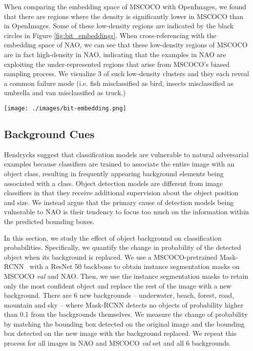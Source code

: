 \documentclass[final]{cvpr}
\begin{document}
When comparing the embedding space of MSCOCO with OpenImages, we found that there are regions where the density is significantly lower in MSCOCO than in OpenImages. Some of these low-density regions are indicated by the black circles in Figure \ref{fig:bit_embeddings}. When cross-referencing with the embedding space of NAO, we can see that these low-density regions of MSCOCO are in fact high-density in NAO, indicating that the examples in NAO are exploiting the under-represented regions that arise from MSCOCO's biased sampling process. We visualize 3 of such low-density clusters and they each reveal a common failure mode (i.e. fish misclassified as bird, insects misclassified as umbrella and van misclassified as truck.)

\begin{figure*}[t]
\begin{center}
   \texttt{[image: ./images/bit-embedding.png]}
\end{center}
   \caption{BiT ResNet-50 embeddings projected by UMAP on OpenImages \textit{train}, MSCOCO \textit{train} and NAO. NAO images are under-represented in MSCOCO.}
\label{fig:long}
\label{fig:onecol}
\label{fig:bit_embeddings}
\end{figure*}

\subsection{Background Cues}

Hendrycks \etal\cite{Hendrycks2019-cn} suggest that classification models are vulnerable to natural adversarial examples because classifiers are trained to associate the entire image with an object class, resulting in frequently appearing background elements being associated with a class. Object detection models are different from image classifiers in that they receive additional supervision about the object position and size. We instead argue that the primary cause of detection models being vulnerable to NAO is their tendency to focus too much on the information within the predicted bounding boxes.

In this section, we study the effect of object background on classification probabilities.  Specifically, we quantify the change in probability of the detected object when its background is replaced. We use a MSCOCO-pretrained Mask-RCNN~\cite{he2017mask} with a ResNet 50 backbone to obtain instance segmentation masks on MSCOCO \textit{val} and NAO. Then, we use the instance segmentation masks to retain only the most confident object and replace the rest of the image with a new background. There are 6 new backgrounds -- underwater, beach, forest, road, mountain and sky -- where Mask-RCNN detects no objects of probability higher than 0.1 from the backgrounds themselves. We measure the change of probability by matching the bounding box detected on the original image and the bounding box detected on the new image with the background replaced. We repeat this process for all images in NAO and MSCOCO \textit{val} set and all 6 backgrounds.
\end{document}
